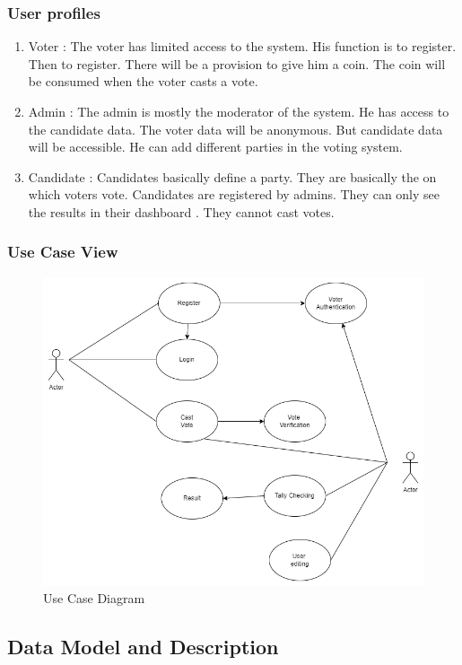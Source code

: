 \documentclass[oneside, 12pt]{book}
\begin{document}
\subsubsection{User profiles}
\begin{enumerate}
	\item Voter : The voter has limited access to the system. His function is to register. Then to register. There will be a provision to give him a coin. The coin will be consumed when the voter casts a vote.
	\item Admin : The admin is mostly the moderator of the system. He has access to the candidate data. The voter data will be anonymous. But candidate data will be accessible. He can add different parties in the voting system.
	\item Candidate : Candidates basically define a party. They are basically the on which voters vote. Candidates are registered by admins. They can only see the results in their dashboard . They cannot cast votes.
\end{enumerate}
\subsubsection{Use Case View}
\begin{figure}[H]
	\centering
	\includegraphics[width=\linewidth]{./Resources/use-case.png}
	\caption{Use Case Diagram}
	\label{fig:use-case}
\end{figure}
\subsection{Data Model and Description}
\end{document}

